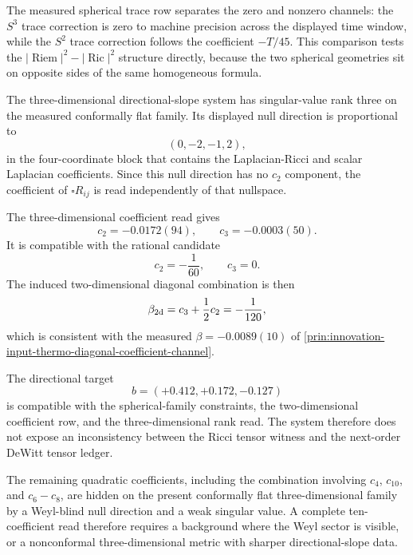 \begin{principle}
\label{prin:innovation-input-thermo-sphere-comparison-witness}
The measured spherical trace row separates the zero and nonzero channels:
the $S^3$ trace correction is zero to machine precision across the
displayed time window, while the $S^2$ trace correction follows the
coefficient $-T/45$. This comparison tests the
$|\operatorname{Riem}|^2-|\operatorname{Ric}|^2$ structure directly,
because the two spherical geometries sit on opposite sides of the same
homogeneous formula.
\end{principle}

\begin{principle}
\label{prin:innovation-input-thermo-three-dimensional-rank-read}
The three-dimensional directional-slope system has singular-value rank
three on the measured conformally flat family. Its displayed null
direction is proportional to
$$
(0,-2,-1,2),
$$
in the four-coordinate block that contains the Laplacian-Ricci and scalar
Laplacian coefficients. Since this null direction has no $c_2$ component,
the coefficient of $\square R_{ij}$ is read independently of that
nullspace.
\end{principle}

\begin{principle}
\label{prin:innovation-input-thermo-laplacian-coefficient-read}
The three-dimensional coefficient read gives
$$
c_2=-0.0172(94),
\qquad
c_3=-0.0003(50).
$$
It is compatible with the rational candidate
$$
c_2=-\frac1{60},
\qquad
c_3=0.
$$
The induced two-dimensional diagonal combination is then
$$
\beta_{\rm 2d}
=
c_3+\frac12c_2
=
-\frac1{120},
$$
which is consistent with the measured
$\beta=-0.0089(10)$ of
\autoref{prin:innovation-input-thermo-diagonal-coefficient-channel}.
\end{principle}

\begin{principle}
\label{prin:innovation-input-thermo-three-dimensional-consistency-check}
The directional target
$$
b=(+0.412,+0.172,-0.127)
$$
is compatible with the spherical-family constraints, the two-dimensional
coefficient row, and the three-dimensional rank read. The system therefore
does not expose an inconsistency between the Ricci tensor witness and the
next-order DeWitt tensor ledger.
\end{principle}

\begin{principle}
\label{prin:innovation-input-thermo-weyl-blind-boundary}
The remaining quadratic coefficients, including the combination involving
$c_4$, $c_{10}$, and $c_6-c_8$, are hidden on the present conformally flat
three-dimensional family by a Weyl-blind null direction and a weak
singular value. A complete ten-coefficient read therefore requires a
background where the Weyl sector is visible, or a nonconformal
three-dimensional metric with sharper directional-slope data.
\end{principle}

